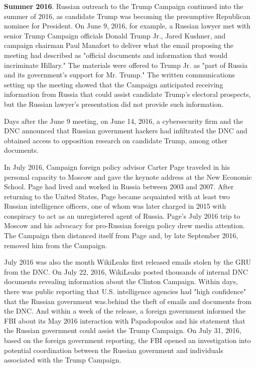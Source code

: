 \documentclass{article}
\begin{document}
\textbf{Summer 2016}.
Russian outreach to the Trump Campaign continued into the summer of 2016, as candidate Trump was becoming the presumptive Republican nominee for President.
On June 9, 2016, for example, a Russian lawyer met with senior Trump Campaign officials Donald Trump Jr., Jared Kushner, and campaign chairman Paul Manafort to deliver what the email proposing the meeting had described as "official documents and information that would incriminate Hillary."
The materials were offered to Trump Jr. as "part of Russia and its government's support for Mr. Trump."
The written communications setting up the meeting showed that the Campaign anticipated receiving information from Russia that could assist candidate Trump's electoral prospects, but the Russian lawyer's presentation did not provide such information.

Days after the June 9 meeting, on June 14, 2016, a cybersecurity firm and the DNC announced that Russian government hackers had infiltrated the DNC and obtained access to opposition research on candidate Trump, among other documents.

In July 2016, Campaign foreign policy advisor Carter Page traveled in his personal capacity to Moscow and gave the keynote address at the New Economic School.
Page had lived and worked in Russia between 2003 and 2007.
After returning to the United States, Page became acquainted with at least two Russian intelligence officers, one of whom was later charged in 2015 with conspiracy to act as an unregistered agent of Russia.
Page's July 2016 trip to Moscow and his advocacy for pro-Russian foreign policy drew media attention.
The Campaign then distanced itself from Page and, by late September 2016, removed him from the Campaign.

July 2016 was also the month WikiLeaks first released emails stolen by the GRU from the DNC.
On July 22, 2016, WikiLeaks posted thousands of internal DNC documents revealing information about the Clinton Campaign.
Within days, there was public reporting that U.S. intelligence agencies had "high confidence" that the Russian government was.behind the theft of emails and documents from the DNC.
And within a week of the release, a foreign government informed the FBI about its May 2016 interaction with Papadopoulos and his statement that the Russian government could assist the Trump Campaign.
On July 31, 2016, based on the foreign government reporting, the FBI opened an investigation into potential coordination between the Russian government and individuals associated with the Trump Campaign.
\end{document}
